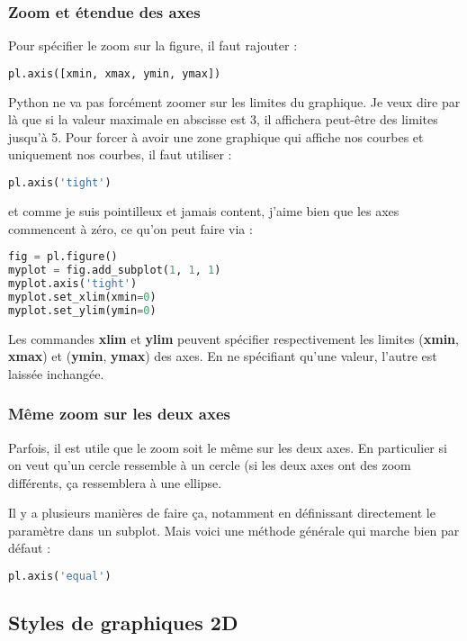 \documentclass[a4paper,twoside]{article}
\begin{document}
\subsubsection{Zoom et étendue des axes}

Pour spécifier le zoom sur la figure, il faut rajouter :
\begin{lstlisting}[language=python]
pl.axis([xmin, xmax, ymin, ymax])
\end{lstlisting}

Python ne va pas forcément zoomer sur les limites du graphique. Je veux dire par là que si la valeur maximale en abscisse est 3, il affichera peut-être des limites jusqu'à 5. Pour forcer à avoir une zone graphique qui affiche nos courbes et uniquement nos courbes, il faut utiliser :
\begin{lstlisting}[language=python]
pl.axis('tight')
\end{lstlisting}

et comme je suis pointilleux et jamais content, j'aime bien que les axes commencent à zéro, ce qu'on peut faire via :
\begin{lstlisting}[language=python]
fig = pl.figure()
myplot = fig.add_subplot(1, 1, 1)
myplot.axis('tight')
myplot.set_xlim(xmin=0)
myplot.set_ylim(ymin=0)
\end{lstlisting}

Les commandes \textbf{xlim} et \textbf{ylim} peuvent spécifier respectivement les limites (\textbf{xmin}, \textbf{xmax}) et (\textbf{ymin}, \textbf{ymax}) des axes. En ne spécifiant qu'une valeur, l'autre est laissée inchangée.

\subsubsection{Même zoom sur les deux axes}
Parfois, il est utile que le zoom soit le même sur les deux axes. En particulier si on veut qu'un cercle ressemble à un cercle (si les deux axes ont des zoom différents, ça ressemblera à une ellipse. 

Il y a plusieurs manières de faire ça, notamment en définissant directement le paramètre dans un subplot. Mais voici une méthode générale qui marche bien par défaut : 
\begin{lstlisting}[language=python]
pl.axis('equal')
\end{lstlisting}


\subsection{Styles de graphiques 2D}
\end{document}
